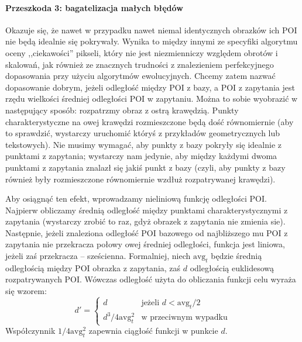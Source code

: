 \documentclass[a4paper,12pt,leqno]{article}
\begin{document}
\paragraph{Przeszkoda 3: bagatelizacja małych błędów}
Okazuje się, że nawet w przypadku nawet niemal identycznych obrazków ich POI nie będą idealnie się pokrywały. Wynika to między innymi ze specyfiki algorytmu oceny
,,ciekawości'' pikseli, który nie jest niezmienniczy względem obrotów i skalowań, jak również ze znacznych trudności z znalezieniem perfekcyjnego dopasowania przy
użyciu algorytmów ewolucyjnych. Chcemy zatem nazwać dopasowanie dobrym, jeżeli odległość między POI z bazy, a POI z zapytania jest rzędu wielkości średniej odległości
POI w zapytaniu. Można to sobie wyobrazić w następujący sposób: rozpatrzmy obraz z ostrą krawędzią. Punkty charakterystyczne na owej krawędzi rozmieszczone będą
dość równomiernie (aby to sprawdzić, wystarczy uruchomić któryś z przykładów geometrycznych lub tekstowych). Nie musimy wymagać, aby punkty z bazy pokryły się idealnie
z punktami z zapytania; wystarczy nam jedynie, aby między każdymi dwoma punktami z zapytania znalazł się jakiś punkt z bazy (czyli, aby punkty z bazy również były
rozmieszczone równomiernie wzdłuż rozpatrywanej krawędzi).

Aby osiągnąć ten efekt, wprowadzamy nieliniową funkcję odległości POI. Najpierw obliczamy średnią odległość między punktami charakterystycznymi z zapytania (wystarczy
zrobić to raz, gdyż obrazek z zapytania nie zmienia sie). Następnie, jeżeli znaleziona odległość POI bazowego od najbliższego mu POI z zapytania nie przekracza połowy
owej średniej odległości, funkcja jest liniowa, jeżeli zaś przekracza -- sześcienna. Formalniej, niech $\mathrm{avg}_t$ będzie średnią odległością między POI obrazka
z zapytania, zaś $d$ odległością euklidesową rozpatrywanych POI. Wówczas odległość użyta do obliczania funkcji celu wyraża się wzorem:
\[ d' = \begin{cases}
	    d & \text{jeżeli } d < \mathrm{avg}_t / 2 \\
	    d^3 / 4\mathrm{avg}_t^2 & \text{w przeciwnym wypadku}
	 \end{cases} \]
Współczynnik $1 / 4\mathrm{avg}_t^2$ zapewnia ciągłość funkcji w punkcie $d$.
\end{document}
